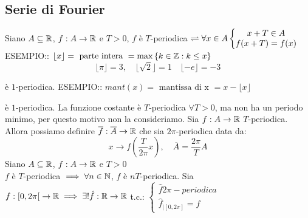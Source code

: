 \subsection{Serie di Fourier}
Siano $A\subseteq \mathbb{R}$, $f:A\to \mathbb{R}$ e $T>0$, $f$ è $T$-periodica $\rightleftharpoons \forall x\in A
\left\{\begin{matrix}
x+T\in A\\f(x+T)=f(x)
\end{matrix}\right. $\\


ESEMPIO:: $\lfloor x \rfloor = \text{ parte intera } = \max\left\{k\in\mathbb{Z}:k \leq x\right\}$
\[\lfloor \pi \rfloor=3, \quad \lfloor \sqrt{2} \rfloor = 1 \quad \lfloor -e \rfloor = -3 \]
\begin{center}
\end{center}
è $1$-periodica.
ESEMPIO:: $mant(x)=\text{ mantissa di x } = x- \lfloor x \rfloor$
\begin{center}
\end{center}
è $1$-periodica.
\observation
La funzione costante è $T$-periodica $\forall T>0$, ma non ha un periodo minimo, per questo motivo non la consideriamo.
\observation
Sia $f:A\to \mathbb{R}$ $T$-periodica. Allora possiamo definire $\overline{f}:\overline{A}\to \mathbb{R}$ che sia $2\pi$-periodica data da:
\[x\to f\left(\frac{T}{2\pi}x\right),\quad \overline{A}=\frac{2\pi}{T}A\]
\proposition
Siano $A\subseteq \mathbb{R}$, $f:A\to \mathbb{R}$ e $T>0$\\
$f$ è $T$-periodica $\implies \forall n\in\mathbb{N}$, $f$ è $nT$-periodica.
\proposition
Sia $f:\left[0,2\pi\right[\to \mathbb{R} \implies \exists ! \hat{f}: \mathbb{R}\to \mathbb{R}$ t.c.: $\left\{\begin{matrix} \hat{f} 2\pi-periodica\\\hat{f}_{\left|\left[0,2\pi\right]\right.}=f\end{matrix}\right.$

